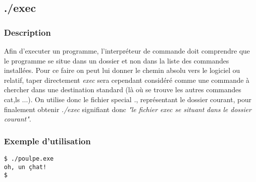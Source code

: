 \subsection*{./exec}
\subsubsection*{Description}
Afin d'executer un programme, l'interpréteur de commande doit comprendre que le programme se situe dans un dossier et non dans la liste des commandes installées.
Pour ce faire on peut lui donner le chemin absolu vers le logiciel ou relatif, taper directement \emph{exec} sera cependant considéré comme une commande à chercher dans une destination standard (là où se trouve les autres commandes cat,ls ...).
On utilise donc le fichier special \emph{.}, représentant le dossier courant, pour finalement obtenir \emph{./exec} signifiant donc \emph{"le fichier exec se situant dans le dossier courant"}.

\subsubsection*{Exemple d'utilisation}
\begin{lstlisting}
$ ./poulpe.exe
oh, un çhat!
$ 
\end{lstlisting}
